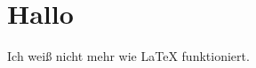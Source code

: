 \documentclass[12pt]{article}
\begin{document}
\section*{Hallo}
Ich weiß nicht mehr wie LaTeX funktioniert.
\end{document}
